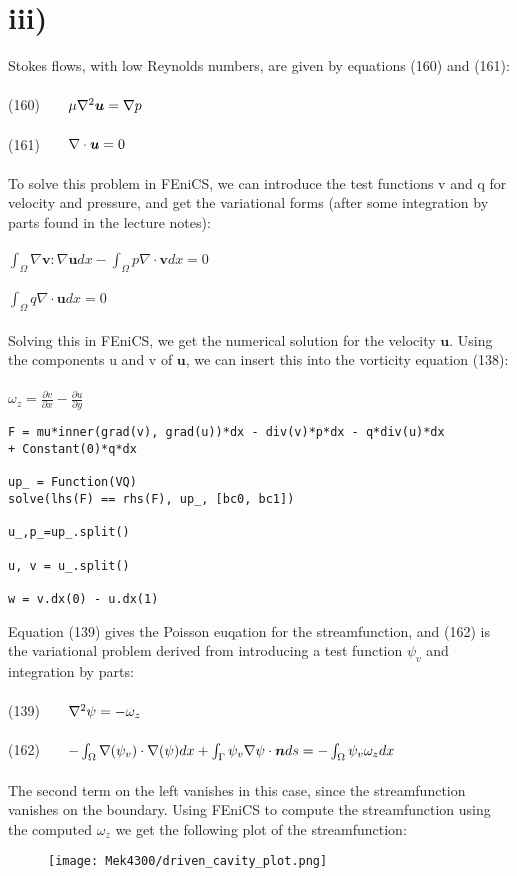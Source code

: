 \documentclass[a4paper,english,11pt,twoside]{article}
\newcommand{\tab}{\hspace*{2em}}
\begin{document}
\newpage
\section*{iii)}
Stokes flows, with low Reynolds numbers, are given by equations (160) and (161):\\
\\
(160)$\tab \mu\nabla^2\boldsymbol{u} = \nabla p$\\
\\
(161)$\tab \nabla\cdot\boldsymbol{u} = 0$\\
\\
To solve this problem in FEniCS, we can introduce the test functions v and q for velocity and pressure, and get the variational forms (after some integration by parts found in the lecture notes):\\
\\
$\int_{\Omega}\nabla\boldsymbol{v} : \nabla\boldsymbol{u}dx - \int_{\Omega}p\nabla\cdot\boldsymbol{v}dx = 0$\\
\\
$\int_{\Omega}q\nabla\cdot\boldsymbol{u}dx = 0$\\
\\
Solving this in FEniCS, we get the numerical solution for the velocity $\boldsymbol{u}$. Using the components u and v of $\boldsymbol{u}$, we can insert this into the vorticity equation (138):\\
\\
$\omega_z = \frac{\partial v}{\partial x} - \frac{\partial u}{\partial y}$\\
\begin{lstlisting}[style=python]
F = mu*inner(grad(v), grad(u))*dx - div(v)*p*dx - q*div(u)*dx 
+ Constant(0)*q*dx

up_ = Function(VQ)
solve(lhs(F) == rhs(F), up_, [bc0, bc1])

u_,p_=up_.split()

u, v = u_.split()

w = v.dx(0) - u.dx(1)
\end{lstlisting}
\newpage
Equation (139) gives the Poisson euqation for the streamfunction, and (162) is the variational problem derived from introducing a test function $\psi_v$ and integration by parts:\\
\\
(139)$\tab \nabla^2\psi = -\omega_z$\\
\\
(162)$\tab -\int_{\Omega}\nabla(\psi_v)\cdot\nabla(\psi)dx + \int_{\Gamma}\psi_v\nabla\psi\cdot\boldsymbol{n}ds = -\int_{\Omega}\psi_v\omega_z dx$\\
\\
The second term on the left vanishes in this case, since the streamfunction vanishes on the boundary. Using FEniCS to compute the streamfunction using the computed $\omega_z$ we get the following plot of the streamfunction:
\begin{figure}[h!]
\texttt{[image: Mek4300/driven\_cavity\_plot.png]}
\end{figure}
\end{document}
